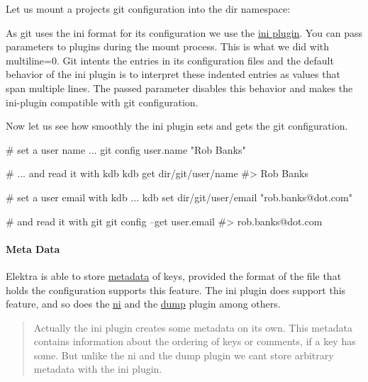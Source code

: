 Let us mount a projects git configuration into the dir namespace\+:




As git uses the {\ttfamily ini} format for its configuration we use the \hyperlink{md_src_plugins_ini_README_src_plugins_ini_README_md}{ini plugin}. You can pass parameters to plugins during the mount process. This is what we did with {\ttfamily multiline=0}. Git intents the entries in its configuration files and the default behavior of the {\ttfamily ini} plugin is to interpret these indented entries as values that span multiple lines. The passed parameter disables this behavior and makes the ini-\/plugin compatible with git configuration.

Now let us see how smoothly the ini plugin sets and gets the git configuration.


\begin{DoxyCode}
# set a user name ...
git config user.name "Rob Banks"

# ... and read it with kdb
kdb get dir/git/user/name
#> Rob Banks

# set a user email with kdb ...
kdb set dir/git/user/email "rob.banks@dot.com"

# and read it with git
git config --get user.email
#> rob.banks@dot.com
\end{DoxyCode}


\paragraph*{Meta Data}

Elektra is able to store \hyperlink{doc_help_elektra-metadata_md}{metadata} of keys, provided the format of the file that holds the configuration supports this feature. The ini plugin does support this feature, and so does the \hyperlink{md_src_plugins_ni_README_src_plugins_ni_README_md}{ni} and the \hyperlink{md_src_plugins_dump_README_src_plugins_dump_README_md}{dump} plugin among others.

\begin{quote}
Actually the ini plugin creates some metadata on its own. This metadata contains information about the ordering of keys or comments, if a key has some. But unlike the ni and the dump plugin we can\textquotesingle{}t store arbitrary metadata with the ini plugin. \end{quote}


